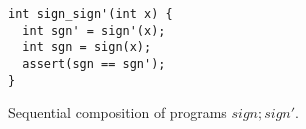 \begin{figure}
\centering
\begin{lstlisting}
int sign_sign'(int x) {
  int sgn' = sign'(x);
  int sgn = sign(x);
  assert(sgn == sgn');
}
\end{lstlisting}
\caption{Sequential composition of programs $sign ; sign'$.}
\end{figure}